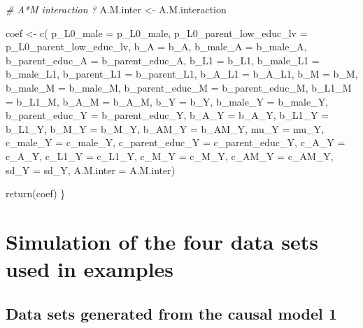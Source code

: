 \documentclass[
]{book}
\newenvironment{Shaded}{\begin{snugshade}}{\end{snugshade}}
\newcommand{\AttributeTok}[1]{\textcolor[rgb]{0.77,0.63,0.00}{#1}}
\newcommand{\CommentTok}[1]{\textcolor[rgb]{0.56,0.35,0.01}{\textit{#1}}}
\newcommand{\FunctionTok}[1]{\textcolor[rgb]{0.00,0.00,0.00}{#1}}
\newcommand{\NormalTok}[1]{#1}
\newcommand{\OtherTok}[1]{\textcolor[rgb]{0.56,0.35,0.01}{#1}}
\begin{document}
\begin{Shaded}
\begin{Highlighting}[]
\CommentTok{\# A*M interaction ?}
\NormalTok{A.M.inter }\OtherTok{\textless{}{-}}\NormalTok{ A.M.interaction}

\NormalTok{coef }\OtherTok{\textless{}{-}} \FunctionTok{c}\NormalTok{( }\AttributeTok{p\_L0\_male =}\NormalTok{ p\_L0\_male, }\AttributeTok{p\_L0\_parent\_low\_educ\_lv =}\NormalTok{ p\_L0\_parent\_low\_educ\_lv, }
           \AttributeTok{b\_A =}\NormalTok{ b\_A, }\AttributeTok{b\_male\_A =}\NormalTok{ b\_male\_A, }\AttributeTok{b\_parent\_educ\_A =}\NormalTok{ b\_parent\_educ\_A, }
           \AttributeTok{b\_L1 =}\NormalTok{ b\_L1, }\AttributeTok{b\_male\_L1 =}\NormalTok{ b\_male\_L1, }\AttributeTok{b\_parent\_L1 =}\NormalTok{ b\_parent\_L1, }
            \AttributeTok{b\_A\_L1 =}\NormalTok{ b\_A\_L1,}
           \AttributeTok{b\_M =}\NormalTok{ b\_M, }\AttributeTok{b\_male\_M =}\NormalTok{ b\_male\_M, }\AttributeTok{b\_parent\_educ\_M =}\NormalTok{ b\_parent\_educ\_M, }
            \AttributeTok{b\_L1\_M =}\NormalTok{ b\_L1\_M, }\AttributeTok{b\_A\_M =}\NormalTok{ b\_A\_M,}
           \AttributeTok{b\_Y =}\NormalTok{ b\_Y, }\AttributeTok{b\_male\_Y =}\NormalTok{ b\_male\_Y, }\AttributeTok{b\_parent\_educ\_Y =}\NormalTok{ b\_parent\_educ\_Y, }
            \AttributeTok{b\_A\_Y =}\NormalTok{ b\_A\_Y, }\AttributeTok{b\_L1\_Y =}\NormalTok{ b\_L1\_Y, }\AttributeTok{b\_M\_Y =}\NormalTok{ b\_M\_Y, }\AttributeTok{b\_AM\_Y =}\NormalTok{ b\_AM\_Y,}
           \AttributeTok{mu\_Y =}\NormalTok{ mu\_Y, }\AttributeTok{c\_male\_Y =}\NormalTok{ c\_male\_Y, }\AttributeTok{c\_parent\_educ\_Y =}\NormalTok{ c\_parent\_educ\_Y, }
            \AttributeTok{c\_A\_Y =}\NormalTok{ c\_A\_Y, }\AttributeTok{c\_L1\_Y =}\NormalTok{ c\_L1\_Y, }\AttributeTok{c\_M\_Y =}\NormalTok{ c\_M\_Y, }\AttributeTok{c\_AM\_Y =}\NormalTok{ c\_AM\_Y, }
              \AttributeTok{sd\_Y =}\NormalTok{ sd\_Y, }\AttributeTok{A.M.inter =}\NormalTok{ A.M.inter)}
  
  \FunctionTok{return}\NormalTok{(coef)}
\NormalTok{\}}
\end{Highlighting}
\end{Shaded}

\hypertarget{simulation-of-the-four-data-sets-used-in-examples}{%
\section{Simulation of the four data sets used in examples}\label{simulation-of-the-four-data-sets-used-in-examples}}

\hypertarget{data-sets-generated-from-the-causal-model-1}{%
\subsection{Data sets generated from the causal model 1}\label{data-sets-generated-from-the-causal-model-1}}
\end{document}
